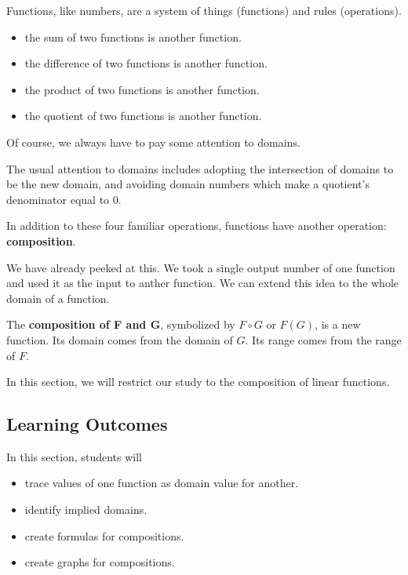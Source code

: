 \documentclass{ximera}
\begin{document}
Functions, like numbers, are a system of things (functions) and rules (operations).  

\begin{itemize}
\item the sum of two functions is another function.
\item the difference of two functions is another function.
\item the product of two functions is another function.
\item the quotient of two functions is another function.
\end{itemize}

Of course, we always have to pay some attention to domains.



The usual attention to domains includes adopting the intersection of domains to be the new domain, and avoiding domain numbers which make a quotient's denominator equal to $0$.



In addition to these four familiar operations, functions have another operation: \textbf{\textcolor{purple!85!blue}{composition}}.

We have already peeked at this. We took a single output number of one function and used it as the input to anther function.  We can extend this idea to the whole domain of a function.


The \textbf{\textcolor{purple!85!blue}{composition of F and G}}, symbolized by $F \circ G$ or $F(G)$, is a new function.  Its domain comes from the domain of $G$. Its range comes from the range of $F$.



In this section, we will restrict our study to the composition of linear functions.















\subsection*{Learning Outcomes}


\begin{sectionOutcomes}
In this section, students will 

\begin{itemize}
\item trace values of one function as domain value for another.
\item identify implied domains.
\item create formulas for compositions.
\item create graphs for compositions.
\end{itemize}
\end{sectionOutcomes}
\end{document}
